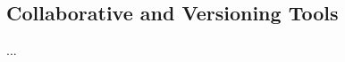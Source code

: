\documentclass[a4paper,11pt]{book}
\numberwithin{figure}{chapter}
\numberwithin{table}{chapter}
\newcommand{\question}[1]{%
    \begin{tcolorbox}[colback=comp_c!10,colframe=comp_c,sidebyside align=top,width=\linewidth,before skip=1ex]
        #1
    \end{tcolorbox}
    \switchcolumn%
}
\newcommand{\note}[1]{%
    \begin{tcolorbox}[colback=white!0,colframe=white!10,width=\linewidth,before skip=1ex]
        #1
    \end{tcolorbox}
}
\newcommand{\summary}[2][]{%
\begin{minipage}[b]{\textwidth}
    \vspace*{\baselineskip}
    \begin{tcolorbox}[colframe=tri_2!75,fonttitle=\large\bfseries\sffamily,
        after skip = \baselineskip,
        title=Summary]
        #2
    \end{tcolorbox}
\end{minipage}
#1}
\begin{document}
\begin{appendices}
\chapter{Collaborative and Versioning Tools}

...

\end{appendices}


%
%
%
%
%
%        
%
%
%    
%
%    
%
%
    
\end{document}
